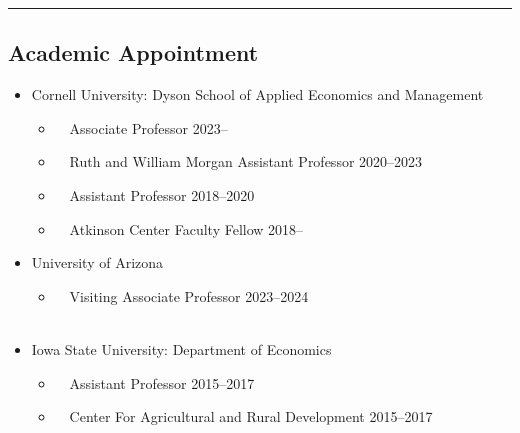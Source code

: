 \documentclass[11pt]{res} %
\begin{document}
\begin{resume}
\vspace{-0.08in}
\hrule
\vspace{-0.1in}

\subsection{Academic Appointment}


	\begin{itemize} \itemsep -12pt
	\item[] Cornell University: Dyson School of Applied Economics and Management
		\vspace{-0.05in}
		\begin{itemize} \itemsep -1pt
			\item[] \,\,\,\, Associate Professor \hfill 2023--
			\item[] \,\,\,\, Ruth and William Morgan Assistant Professor \hfill 2020--2023
			\item[] \,\,\,\, Assistant Professor \hfill 2018--2020
			\item[] \,\,\,\, Atkinson Center Faculty Fellow \hfill 2018--\\
		\end{itemize}
		\item[] University of Arizona
		\vspace{-0.05in} 
		\begin{itemize}
			\item[] \,\,\,\, Visiting Associate Professor \hfill 2023--2024\\\
		\end{itemize}
		\item[] Iowa State University: Department of Economics
		\vspace{-0.05in}
		\begin{itemize} \itemsep -1pt
			\item[] \,\,\,\, Assistant Professor \hfill 2015--2017
			\item[] \,\,\,\, Center For Agricultural and Rural Development \hfill 2015--2017 \\\
		\end{itemize}
	\end{itemize}
\vspace{-0.5in}


\end{resume}
\end{document}
